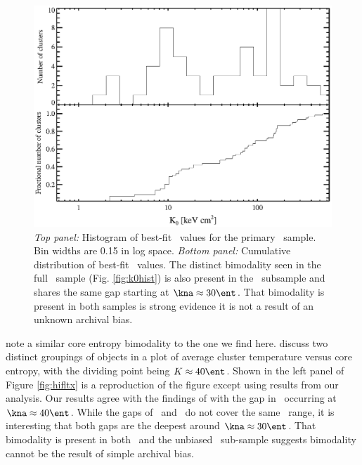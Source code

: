 \begin{figure}[htp]
  \begin{center}
    \begin{minipage}[htp]{\linewidth}
      \includegraphics*[width=\textwidth, trim=20mm 10mm 10mm 10mm, clip]{hifl_k0hist}
      \caption[Histogram and cumulative distribution of best-fit
        \kna\ for primary \hifl\ sample.]{{\it{Top panel:}} Histogram
        of best-fit \kna\ values for the primary \hifl\ sample. Bin
        widths are 0.15 in log space.  {\it{Bottom panel:}} Cumulative
        distribution of best-fit \kna\ values. The distinct bimodality
        seen in the full \accept\ sample (Fig. \ref{fig:k0hist}) is
        also present in the \hifl\ subsample and shares the same gap
        starting at $\kna \approx 30 \ent$. That bimodality is present
        in both samples is strong evidence it is not a result of an
        unknown archival bias.}
      \label{fig:hiflk0}
    \end{minipage}
  \end{center}
\end{figure}

\citet{2007hvcg.conf...42H} note a similar core entropy bimodality to
the one we find here. \citet{2007hvcg.conf...42H} discuss two distinct
groupings of objects in a plot of average cluster temperature versus
core entropy, with the dividing point being $K \approx 40 \ent$. Shown
in the left panel of Figure \ref{fig:hifltx} is a reproduction of the
\citet{2007hvcg.conf...42H} figure except using results from our
analysis. Our results agree with the findings of
\citet{2007hvcg.conf...42H} with the gap in \kna\ occurring at $\kna
\approx 40 \ent$. While the gaps of \accept\ and \hifl\ do not cover
the same \kna\ range, it is interesting that both gaps are the deepest
around $\kna \approx 30 \ent$. That bimodality is present in both
\accept\ and the unbiased \hifl\ sub-sample suggests bimodality cannot
be the result of simple archival bias.

